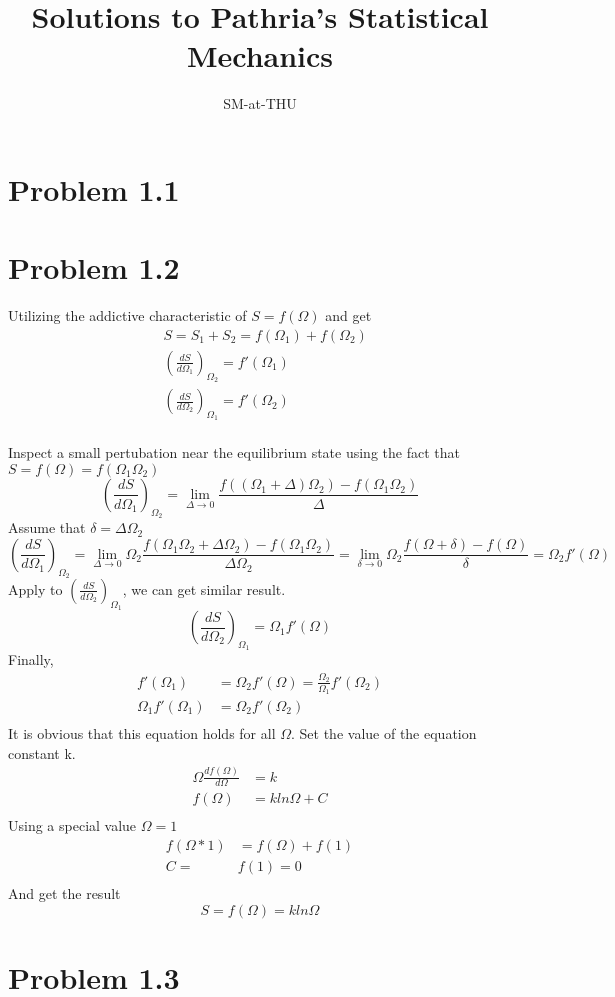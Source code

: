 \documentclass{article}
\author{SM-at-THU}
\title{\bf{Solutions to Pathria's Statistical Mechanics}}
\begin{document}
\maketitle
\section*{Problem 1.1}

\section*{Problem 1.2}
Utilizing the addictive characteristic of $S=f(\Omega)$ and get
\begin{align}
&S=S_1+S_2=f(\Omega_1)+f(\Omega_2)\\
&(\frac{dS}{d\Omega_1})_{\Omega_2}=f'(\Omega_1)\\
&(\frac{dS}{d\Omega_2})_{\Omega_1}=f'(\Omega_2)\\
\end{align}

Inspect a small pertubation near the equilibrium state using the fact that $S=f(\Omega)=f(\Omega_1\Omega_2)$
\begin{equation}
(\frac{dS}{d\Omega_1})_{\Omega_2}=\lim_{\Delta\rightarrow 0}{\frac{f((\Omega_1+\Delta)\Omega_2)-f(\Omega_1\Omega_2)}{\Delta}}
\end{equation}
Assume that $\delta=\Delta\Omega_2$
\begin{equation}
(\frac{dS}{d\Omega_1})_{\Omega_2}=\lim_{\Delta\rightarrow 0}{\Omega_2\frac{f(\Omega_1\Omega_2+\Delta\Omega_2)-f(\Omega_1\Omega_2)}{\Delta\Omega_2}}=\lim_{\delta\rightarrow 0}{\Omega_2\frac{f(\Omega+\delta)-f(\Omega)}{\delta}}=\Omega_2f'(\Omega)
\end{equation}
Apply to $(\frac{dS}{d\Omega_2})_{\Omega_1}$, we can get similar result.
\begin{equation}
(\frac{dS}{d\Omega_2})_{\Omega_1}=\Omega_1f'(\Omega)
\end{equation}
Finally,
\begin{align}
f'(\Omega_1)&=\Omega_2f'(\Omega)=\frac{\Omega_2}{\Omega_1}f'(\Omega_2)\\
\Omega_1f'(\Omega_1)&=\Omega_2f'(\Omega_2)\\
\end{align}
It is obvious that this equation holds for all $\Omega$. Set the value of the equation constant k. 
\begin{align}
\Omega\frac{df(\Omega)}{d\Omega}&=k\\
f(\Omega)&=kln\Omega+C\\
\end{align}
Using a special value $\Omega=1$
\begin{align}
f(\Omega*1)&=f(\Omega)+f(1)\\
C=&f(1)=0\\
\end{align}
And get the result 
\begin{equation}
S=f(\Omega)=kln\Omega
\end{equation}
\section*{Problem 1.3}
\end{document}
